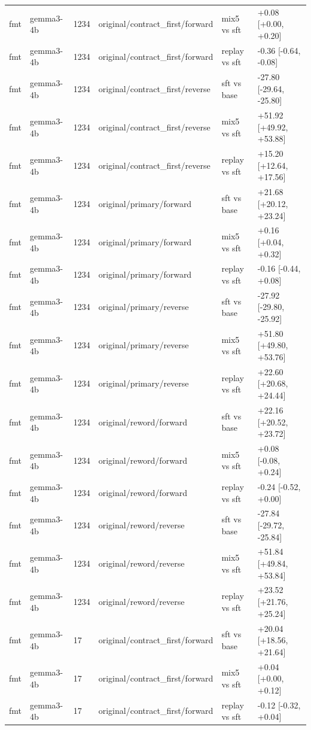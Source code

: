 \begin{table}[t]
\begin{tabular}{llllll}
fmt & gemma3-4b & 1234 & original/contract\_first/forward & mix5 vs sft & +0.08 [+0.00, +0.20] \\
fmt & gemma3-4b & 1234 & original/contract\_first/forward & replay vs sft & -0.36 [-0.64, -0.08] \\
fmt & gemma3-4b & 1234 & original/contract\_first/reverse & sft vs base & -27.80 [-29.64, -25.80] \\
fmt & gemma3-4b & 1234 & original/contract\_first/reverse & mix5 vs sft & +51.92 [+49.92, +53.88] \\
fmt & gemma3-4b & 1234 & original/contract\_first/reverse & replay vs sft & +15.20 [+12.64, +17.56] \\
fmt & gemma3-4b & 1234 & original/primary/forward & sft vs base & +21.68 [+20.12, +23.24] \\
fmt & gemma3-4b & 1234 & original/primary/forward & mix5 vs sft & +0.16 [+0.04, +0.32] \\
fmt & gemma3-4b & 1234 & original/primary/forward & replay vs sft & -0.16 [-0.44, +0.08] \\
fmt & gemma3-4b & 1234 & original/primary/reverse & sft vs base & -27.92 [-29.80, -25.92] \\
fmt & gemma3-4b & 1234 & original/primary/reverse & mix5 vs sft & +51.80 [+49.80, +53.76] \\
fmt & gemma3-4b & 1234 & original/primary/reverse & replay vs sft & +22.60 [+20.68, +24.44] \\
fmt & gemma3-4b & 1234 & original/reword/forward & sft vs base & +22.16 [+20.52, +23.72] \\
fmt & gemma3-4b & 1234 & original/reword/forward & mix5 vs sft & +0.08 [-0.08, +0.24] \\
fmt & gemma3-4b & 1234 & original/reword/forward & replay vs sft & -0.24 [-0.52, +0.00] \\
fmt & gemma3-4b & 1234 & original/reword/reverse & sft vs base & -27.84 [-29.72, -25.84] \\
fmt & gemma3-4b & 1234 & original/reword/reverse & mix5 vs sft & +51.84 [+49.84, +53.84] \\
fmt & gemma3-4b & 1234 & original/reword/reverse & replay vs sft & +23.52 [+21.76, +25.24] \\
fmt & gemma3-4b & 17 & original/contract\_first/forward & sft vs base & +20.04 [+18.56, +21.64] \\
fmt & gemma3-4b & 17 & original/contract\_first/forward & mix5 vs sft & +0.04 [+0.00, +0.12] \\
fmt & gemma3-4b & 17 & original/contract\_first/forward & replay vs sft & -0.12 [-0.32, +0.04] \\

\end{tabular}
\end{table}
